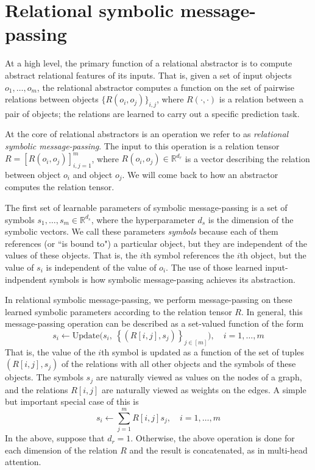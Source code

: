 
\def\m{m}


\section{Relational symbolic message-passing}
\label{sec:message_passing}

At a high level, the primary function of a relational abstractor is to compute abstract relational features of its inputs. That is, given a set of input objects $o_1, \ldots, o_\m$, the relational abstractor computes a function on the set of pairwise relations between objects $\{ R(o_i, o_j) \}_{i,j}$, where $R(\cdot, \cdot)$ is a relation between a pair of objects; the relations are learned to carry out a specific prediction task.

At the core of relational abstractors is an operation we refer to as \textit{relational symbolic message-passing}. The input to this operation is a relation tensor $R = \left[R(o_i, o_j)\right]_{i,j=1}^\m$, where $R(o_i, o_j) \in \mathbb{R}^{d_r}$ is a vector describing the relation between object $o_i$ and object $o_j$. We will come back to how an abstractor computes the relation tensor.

The first set of learnable parameters of symbolic message-passing is a set of symbols $s_1, \ldots, s_\m \in \mathbb{R}^{d_s}$, where the hyperparameter $d_s$ is the dimension of the symbolic vectors. We call these parameters \textit{symbols} because each of them references (or ``is bound to") a particular object, but they are independent of the values of these objects. That is, the $i$th symbol references the $i$th object, but the value of $s_i$ is independent of the value of $o_i$. The use of those learned input-indpendent symbols is how symbolic message-passing achieves its abstraction.

In relational symbolic message-passing, we perform message-passing on these learned symbolic parameters according to the relation tensor $R$. In general, this message-passing operation can be described as a set-valued function of the form
\begin{equation}
    \label{eq:symbolic_message_passing}
    s_i \leftarrow \text{Update}\Big( s_i, \ \left\{ \left(R[i,j], s_j\right)\right\}_{j\in[m]}\Big), \quad i = 1, \ldots, m
\end{equation}
That is, the value of the $i$th symbol is updated as a function of the set of tuples $(R[i,j], s_j)$ of the relations with all other objects and the symbols of these objects. The symbols $s_j$ are naturally viewed
as values on the nodes of a graph, and the relations $R[i,j]$ are naturally viewed as weights on the edges. A simple but important special case of this is
\begin{equation}
    \label{eq:linear_symbolic_mp}
    s_i \leftarrow \sum_{j=1}^{m} R[i,j] s_j, \quad i=1, \ldots, m
\end{equation}
In the above, suppose that $d_r = 1$. Otherwise, the above operation is done for each dimension of the relation $R$ and the result is concatenated, as in multi-head attention.

